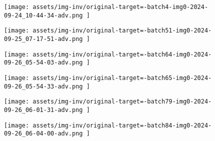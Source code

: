 \begin{figure*}[t]
    \vspace{1mm}
    \begin{minipage}[t]{.025\textwidth}
         \vspace{11mm}
    \end{minipage}%
    \begin{minipage}[t]{.98\textwidth}
        \vspace{0pt}
            \begin{subfigure}[t]{0.16\textwidth}
                    \texttt{[image:  assets/img-inv/original-target=-batch4-img0-2024-09-24\_10-44-34-adv.png ]}
            \end{subfigure}%
                \hspace{0.5mm}%
            \begin{subfigure}[t]{0.16\textwidth}
                    \texttt{[image:  assets/img-inv/original-target=-batch51-img0-2024-09-25\_07-17-51-adv.png ]}
            \end{subfigure}%
                \hspace{0.5mm}%
            \begin{subfigure}[t]{0.16\textwidth}
                    \texttt{[image:  assets/img-inv/original-target=-batch64-img0-2024-09-26\_05-54-03-adv.png ]}
            \end{subfigure}%
                \hspace{0.5mm}%
            \begin{subfigure}[t]{0.16\textwidth}
                    \texttt{[image:  assets/img-inv/original-target=-batch65-img0-2024-09-26\_05-54-33-adv.png ]}
            \end{subfigure}%
                \hspace{0.5mm}%
            \begin{subfigure}[t]{0.16\textwidth}
                    \texttt{[image:  assets/img-inv/original-target=-batch79-img0-2024-09-26\_06-01-31-adv.png ]}
            \end{subfigure}%
                \hspace{0.5mm}%
            \begin{subfigure}[t]{0.16\textwidth}
                    \texttt{[image:  assets/img-inv/original-target=-batch84-img0-2024-09-26\_06-04-00-adv.png ]}
            \end{subfigure}%
    \end{minipage}


\end{figure*}
